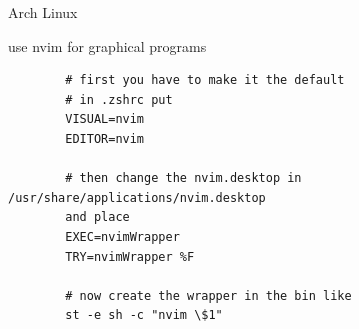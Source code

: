 \begin{section}{Arch Linux}
\begin{subsection}{use nvim for graphical programs}
	\begin{verbatim}
		# first you have to make it the default
		# in .zshrc put
		VISUAL=nvim
		EDITOR=nvim

		# then change the nvim.desktop in /usr/share/applications/nvim.desktop
		and place 
		EXEC=nvimWrapper
		TRY=nvimWrapper %F

		# now create the wrapper in the bin like
		st -e sh -c "nvim \$1"
	\end{verbatim}
\end{subsection}
\end{section}


